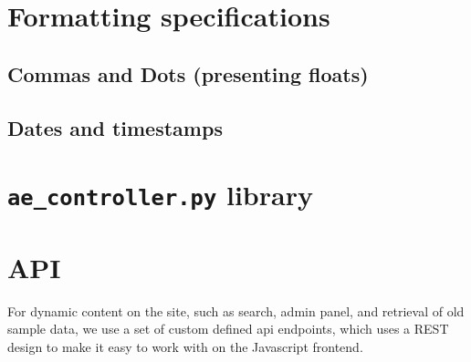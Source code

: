 \documentclass{article}
\begin{document}

\section{Formatting specifications}
\subsection{Commas and Dots (presenting floats)}


\subsection{Dates and timestamps}


\section{\texttt{ae\_controller.py} library}


\section{API}
For dynamic content on the site, such as search, admin panel, and retrieval of old sample data, we use a set of custom defined api endpoints, which uses a REST design to make it easy to work with on the Javascript frontend.
\end{document}
